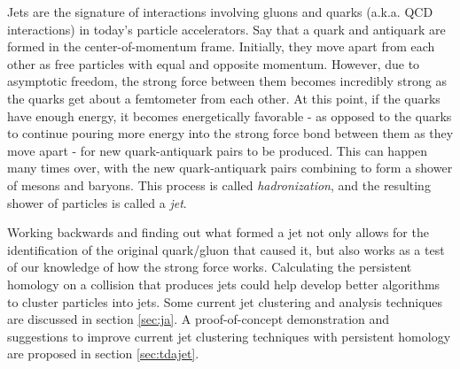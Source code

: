 \documentclass[a4paper,12pt]{report}
\begin{document}
Jets are the signature of interactions involving gluons and quarks (a.k.a. QCD interactions) in today's particle accelerators. Say that a quark and antiquark are formed in the center-of-momentum frame. Initially, they move apart from each other as free particles with equal and opposite momentum. However, due to asymptotic freedom, the strong force between them becomes incredibly strong as the quarks get about a femtometer from each other. At this point, if the quarks have enough energy, it becomes energetically favorable - as opposed to the quarks to continue pouring more energy into the strong force bond between them as they move apart - for new quark-antiquark pairs to be produced. This can happen many times over, with the new quark-antiquark pairs combining to form a shower of mesons and baryons. This process is called \textit{hadronization}, and the resulting shower of particles is called a \textit{jet}.

Working backwards and finding out what formed a jet not only allows for the identification of the original quark/gluon that caused it, but also works as a test of our knowledge of how the strong force works. Calculating the persistent homology on a collision that produces jets could help develop better algorithms to cluster particles into jets. Some current jet clustering and analysis techniques are discussed in section \ref{sec:ja}. A proof-of-concept demonstration and suggestions to improve current jet clustering techniques with persistent homology are proposed in section \ref{sec:tdajet}. 

\end{document}
